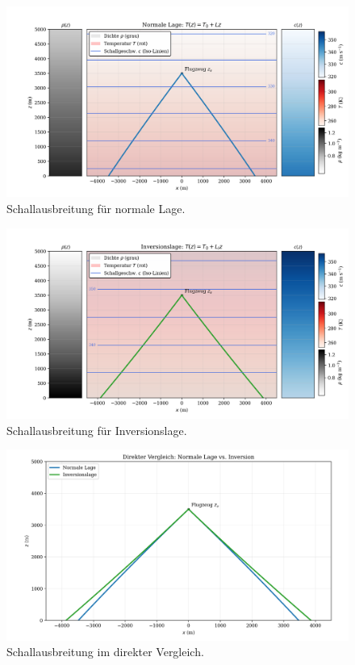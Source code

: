 

\begin{figure}
    \centering
    \includegraphics[width=\textwidth]{papers/schall/figures/normal_sidepanels.png}
    \caption{Schallausbreitung für normale Lage.}
    \label{fig:schall:norm-lage}
\end{figure}

\begin{figure}
    \centering
    \includegraphics[width=\textwidth]{papers/schall/figures/inversion_sidepanels.png}
    \caption{Schallausbreitung für Inversionslage.}
    \label{fig:schall:inv-lage}
\end{figure}

\begin{figure}
    \centering
    \includegraphics[width=\textwidth]{papers/schall/figures/overlay_clean.png}
    \caption{Schallausbreitung im direkter Vergleich.}
    \label{fig:schall:norm-vs-inv-lage}
\end{figure}